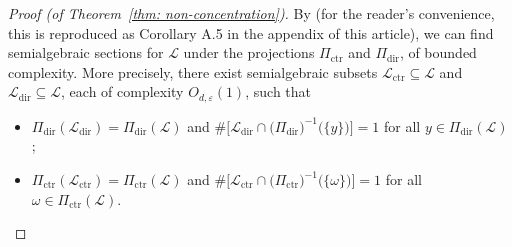 \documentclass[reqno]{amsart}
\numberwithin{equation}{section}
\newcommand{\cL}{\mathcal{L}}
\theoremstyle{plain}
\theoremstyle{definition}
\newcommand{\ctr}{\mathrm{ctr}}
\newcommand{\dir}{\mathrm{dir}}
\begin{document}
\begin{proof}[Proof (of Theorem~\ref{thm: non-concentration})]
 By \cite[Lemma 2.2]{KR2018} (for the reader's convenience, this is reproduced as Corollary A.5 in the appendix of this article), we can find semialgebraic sections for $\cL$ under the projections $\Pi_{\ctr}$ and $\Pi_{\dir}$, of bounded complexity.  More precisely, there exist semialgebraic subsets $\cL_{\ctr}\subseteq \cL$ and $\cL_{\dir} \subseteq \cL$, each of complexity $O_{d, \varepsilon}(1)$, such that
 \begin{itemize}
     \item $\Pi_{\dir}(\cL_{\dir})=\Pi_{\dir}(\cL)$ and $\#\big[\cL_{\dir} \cap \big(\Pi_{\dir}\big)^{-1}\big(\{y\}\big)\big] = 1$ for all $y \in\Pi_{\dir}(\cL)$;
     \item $\Pi_{\ctr}(\cL_{\ctr})=\Pi_{\ctr}(\cL)$ and $\#\big[\cL_{\ctr} \cap \big(\Pi_{\ctr}\big)^{-1}\big(\{\omega\}\big)\big] = 1$ for all $\omega\in\Pi_{\ctr}(\cL)$.
 \end{itemize}


\end{proof}
\end{document}
